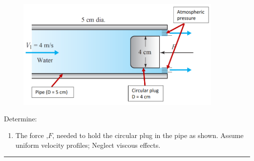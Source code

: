 \documentclass[12pt]{article}
\begin{document}
\begin{enumerate}
\begin{figure}[h!] %
   \centering
   \includegraphics[width=4in]{plug-valve.png} 
   \caption{}
   \label{fig:plugvalve}
\end{figure}

Determine:
\begin{enumerate}
\item The force ,$F$, needed to hold the circular plug in the pipe as shown. Assume uniform velocity profiles;  Neglect viscous effects. 
\end{enumerate}
\noindent\rule{\linewidth}{0.4pt}
\end{enumerate}
\end{document}
